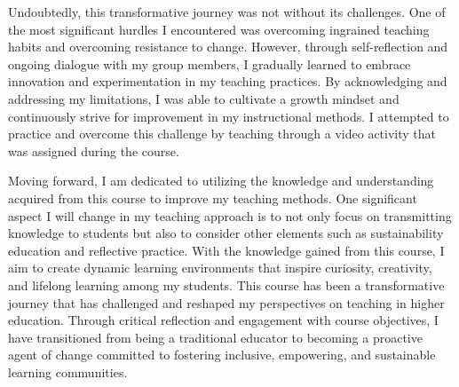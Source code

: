 \documentclass[12pt,a4paper]{article}
\begin{document}
Undoubtedly, this transformative journey was not without its challenges. One of the most significant hurdles I encountered was overcoming ingrained teaching habits and overcoming resistance to change. However, through self-reflection and ongoing dialogue with my group members, I gradually learned to embrace innovation and experimentation in my teaching practices. By acknowledging and addressing my limitations, I was able to cultivate a growth mindset and continuously strive for improvement in my instructional methods. I attempted to practice and overcome this challenge by teaching through a video activity that was assigned during the course. 

Moving forward, I am dedicated to utilizing the knowledge and understanding acquired from this course to improve my teaching methods. One significant aspect I will change in my teaching approach is to not only focus on transmitting knowledge to students but also to consider other elements such as sustainability education and reflective practice. With the knowledge gained from this course, I aim to create dynamic learning environments that inspire curiosity, creativity, and lifelong learning among my students. This course has been a transformative journey that has challenged and reshaped my perspectives on teaching in higher education. Through critical reflection and engagement with course objectives, I have transitioned from being a traditional educator to becoming a proactive agent of change committed to fostering inclusive, empowering, and sustainable learning communities.



\end{document}
